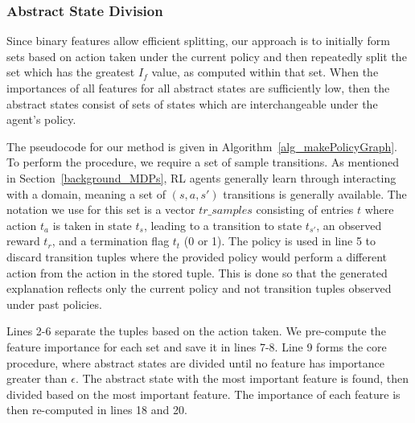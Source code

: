 \documentclass[letterpaper]{article} %
\begin{document}
\subsubsection{Abstract State Division}
Since binary features allow efficient splitting, our approach is to initially form sets based on action taken under the current policy and then repeatedly split the set which has the greatest $I_f$ value, as computed within that set. When the importances of all features for all abstract states are sufficiently low, then the abstract states consist of sets of states which are interchangeable under the agent's policy.

The pseudocode for our method is given in Algorithm~\ref{alg_makePolicyGraph}. To perform the procedure, we require a set of sample transitions. As mentioned in Section~\ref{background_MDPs}, RL agents generally learn through interacting with a domain, meaning a set of $(s,a,s')$ transitions is generally available. The notation we use for this set is a vector $tr\_samples$ consisting of entries $t$ where action $t_a$ is taken in state $t_s$, leading to a transition to state $t_{s'}$, an observed reward $t_r$, and a termination flag $t_t$ (0 or 1). The policy is used in line 5 to discard transition tuples where the provided policy would perform a different action from the action in the stored tuple. This is done so that the generated explanation reflects only the current policy and not transition tuples observed under past policies.

Lines 2-6 separate the tuples based on the action taken. We pre-compute the feature importance for each set and save it in lines 7-8. Line 9 forms the core procedure, where abstract states are divided until no feature has importance greater than $\epsilon$. The abstract state with the most important feature is found, then divided based on the most important feature. The importance of each feature is then re-computed in lines 18 and 20.
\end{document}
